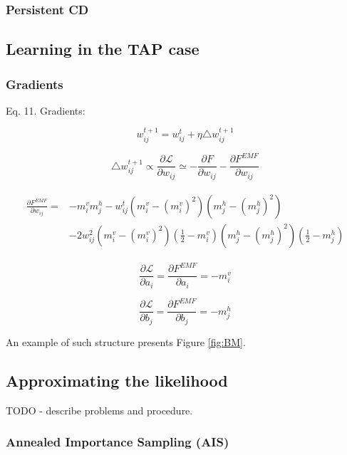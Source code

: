 \documentclass[../report/report.tex]{subfiles}
\begin{document}
 \subsubsection{Persistent CD}   
   \subsection{Learning in the TAP case}
    \subsubsection{Gradients}

Eq. 11. Gradients:

$$w_{ij}^{t+1} = w_{ij}^{t} + \eta \triangle w_{ij}^{t+1}$$

$$ \triangle w_{ij}^{t+1} \propto \frac{\partial \mathcal{L}}{\partial w_{ij}} \simeq -\frac{\partial F}{\partial w_{ij}} - \frac{\partial F^{EMF}}{\partial w_{ij}}$$

\begin{align*}
\begin{split}
\frac{\partial F^{EMF}}{\partial w_{ij}} = & -m_i^v m_j^h - w_{ij}^t(m_i^v - (m_i^v)^2)(m_j^h - (m_j^h)^2) \\
 & - 2w_{ij}^2 (m_i^v - (m_i^v)^2)(\frac{1}{2} - m_i^v)(m_j^h - (m_j^h)^2)(\frac{1}{2} - m_j^h)
\end{split}
\end{align*}

$$\frac{\partial \mathcal{L}}{\partial a_i} = \frac{\partial F^{EMF}}{\partial a_i} = -m_i^v$$

$$\frac{\partial \mathcal{L}}{\partial b_j} = \frac{\partial F^{EMF}}{\partial b_j} = -m_j^h$$

 
An example of such structure presents Figure \ref{fig:BM}.
\subsection{Approximating the likelihood}
TODO - describe problems and procedure.
\subsubsection{Annealed Importance Sampling (AIS)}
\end{document}
